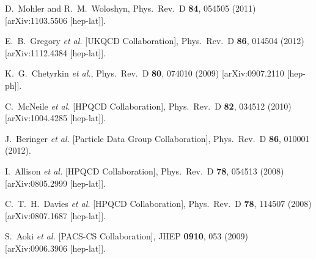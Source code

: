 \begin{thebibliography}{99}
  D.~Mohler and R.~M.~Woloshyn,
  Phys.\ Rev.\ D {\bf 84}, 054505 (2011)
  [arXiv:1103.5506 [hep-lat]].
  
  E.~B.~Gregory {\it et al.}  [UKQCD Collaboration],
  Phys.\ Rev.\ D {\bf 86}, 014504 (2012)
  [arXiv:1112.4384 [hep-lat]].

  K.~G.~Chetyrkin {\it et al.},
  Phys.\ Rev.\ D {\bf 80}, 074010 (2009)
  [arXiv:0907.2110 [hep-ph]].

  C.~McNeile {\it et al.} [HPQCD Collaboration],
  Phys.\ Rev.\ D {\bf 82}, 034512 (2010)
  [arXiv:1004.4285 [hep-lat]].
  
  J.~Beringer {\it et al.}  [Particle Data Group Collaboration],
  Phys.\ Rev.\ D {\bf 86}, 010001 (2012).
  
  I.~Allison {\it et al.}  [HPQCD Collaboration],
  Phys.\ Rev.\ D {\bf 78}, 054513 (2008)
  [arXiv:0805.2999 [hep-lat]].
  
  C.~T.~H.~Davies {\it et al.}  [HPQCD Collaboration],
  Phys.\ Rev.\ D {\bf 78}, 114507 (2008)
  [arXiv:0807.1687 [hep-lat]].
  
  S.~Aoki {\it et al.}  [PACS-CS Collaboration],
  JHEP {\bf 0910}, 053 (2009)
  [arXiv:0906.3906 [hep-lat]].
  

\end{thebibliography}
